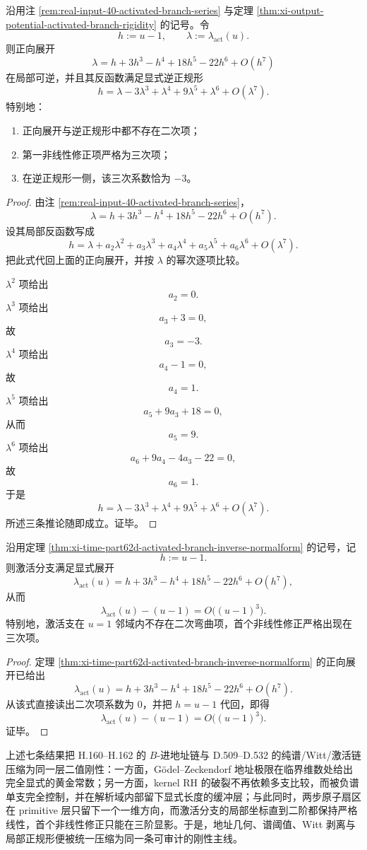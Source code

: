 \begin{theorem}[激活分支在 \texorpdfstring{$u=1$}{u=1} 的逆正规形与无二次重整化]\label{thm:xi-time-part62d-activated-branch-inverse-normalform}
沿用注 \ref{rem:real-input-40-activated-branch-series} 与定理
\ref{thm:xi-output-potential-activated-branch-rigidity} 的记号。令
\[
h:=u-1,
\qquad
\lambda:=\lambda_{\mathrm{act}}(u).
\]
则正向展开
\[
\lambda
=
h+3h^3-h^4+18h^5-22h^6+O(h^7)
\]
在局部可逆，并且其反函数满足显式逆正规形
\[
h
=
\lambda-3\lambda^3+\lambda^4+9\lambda^5+\lambda^6+O(\lambda^7).
\]
特别地：
\begin{enumerate}
  \item 正向展开与逆正规形中都不存在二次项；
  \item 第一非线性修正项严格为三次项；
  \item 在逆正规形一侧，该三次系数恰为 \(-3\)。
\end{enumerate}
\end{theorem}
\begin{proof}
由注 \ref{rem:real-input-40-activated-branch-series}，
\[
\lambda
=
h+3h^3-h^4+18h^5-22h^6+O(h^7).
\]
设其局部反函数写成
\[
h
=
\lambda+a_2\lambda^2+a_3\lambda^3+a_4\lambda^4+a_5\lambda^5+a_6\lambda^6+O(\lambda^7).
\]
把此式代回上面的正向展开，并按 \(\lambda\) 的幂次逐项比较。

\(\lambda^2\) 项给出
\[
a_2=0.
\]
\(\lambda^3\) 项给出
\[
a_3+3=0,
\]
故
\[
a_3=-3.
\]
\(\lambda^4\) 项给出
\[
a_4-1=0,
\]
故
\[
a_4=1.
\]
\(\lambda^5\) 项给出
\[
a_5+9a_3+18=0,
\]
从而
\[
a_5=9.
\]
\(\lambda^6\) 项给出
\[
a_6+9a_4-4a_3-22=0,
\]
故
\[
a_6=1.
\]
于是
\[
h
=
\lambda-3\lambda^3+\lambda^4+9\lambda^5+\lambda^6+O(\lambda^7).
\]
所述三条推论随即成立。证毕。
\end{proof}

\begin{theorem}[激活支的二阶沉默]\label{thm:xi-time-part62d-activated-branch-second-order-silence}
沿用定理 \ref{thm:xi-time-part62d-activated-branch-inverse-normalform} 的记号，记
\[
h:=u-1.
\]
则激活分支满足显式展开
\[
\lambda_{\mathrm{act}}(u)
=
h+3h^3-h^4+18h^5-22h^6+O(h^7),
\]
从而
\[
\lambda_{\mathrm{act}}(u)-(u-1)=O\!\bigl((u-1)^3\bigr).
\]
特别地，激活支在 \(u=1\) 邻域内不存在二次弯曲项，首个非线性修正严格出现在三次项。
\end{theorem}
\begin{proof}
定理 \ref{thm:xi-time-part62d-activated-branch-inverse-normalform} 的正向展开已给出
\[
\lambda_{\mathrm{act}}(u)
=
h+3h^3-h^4+18h^5-22h^6+O(h^7).
\]
从该式直接读出二次项系数为 \(0\)，并把 \(h=u-1\) 代回，即得
\[
\lambda_{\mathrm{act}}(u)-(u-1)=O\!\bigl((u-1)^3\bigr).
\]
证毕。
\end{proof}

\noindent
上述七条结果把 H.160--H.162 的 \(B\)-进地址链与 D.509--D.532 的纯谱/Witt/激活链压缩为同一层二值刚性：一方面，Gödel--Zeckendorf 地址极限在临界维数处给出完全显式的黄金常数；另一方面，kernel RH 的破裂不再依赖多支比较，而被负谱单支完全控制，并在解析域内部留下显式长度的缓冲层；与此同时，两步原子扇区在 primitive 层只留下一个一维方向，而激活分支的局部坐标直到二阶都保持严格线性，首个非线性修正只能在三阶显影。于是，地址几何、谱阈值、Witt 剥离与局部正规形便被统一压缩为同一条可审计的刚性主线。

\endinput
